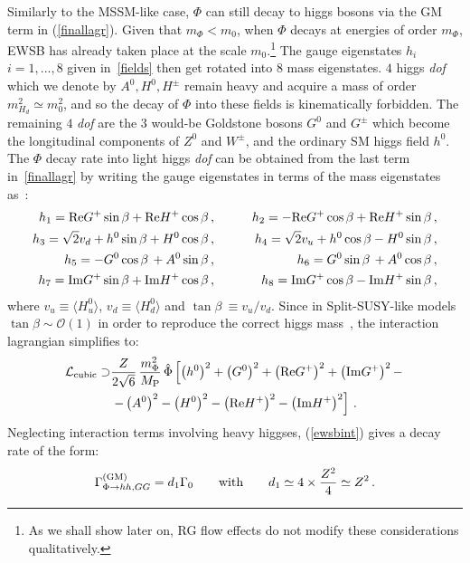 \documentclass[12pt,a4paper]{book}
\def\nn{\nonumber}
\def\nn{\nonumber}
\newcommand{\mc}{\mathcal}
\begin{document}
Similarly to the MSSM-like case, $\Phi$ can still decay to higgs bosons via the GM term in (\ref{finallagr}). Given that $m_\Phi< m_0$, when $\Phi$ decays at energies of order $m_\Phi$, EWSB has already taken place at the scale $m_0$.\footnote{As we shall show later on, RG flow effects do not modify these considerations qualitatively.} The gauge eigenstates $h_i$ $i=1,...,8$ given in~\eqref{fields} then get rotated into $8$ mass eigenstates. $4$ higgs \textit{dof} which we denote by $A^0, H^0, H^\pm$ remain heavy and acquire a mass of order $m_{H_d}^2 \simeq m_0^2$, and so the decay of $\Phi$ into these fields is kinematically forbidden. The remaining $4$ \textit{dof} are the $3$ would-be Goldstone bosons $G^0$ and $G^{\pm}$ which become the longitudinal components of $Z^0$ and $W^{\pm}$, and the ordinary SM higgs field $h^0$. The $\Phi$ decay rate into light higgs \textit{dof} can be obtained from the last term in~\eqref{finallagr} by writing the gauge eigenstates in terms of the mass eigenstates as~\cite{Martin:1997ns}:
\begin{align}
h_1 = {\rm Re} G^+ \sin\beta + {\rm Re} H^+ \cos\beta\,,&\qquad& h_2 = - {\rm Re} G^+ \cos\beta + {\rm Re} H^+ \sin\beta\,, \nn \\
h_3 = \sqrt{2} v_d + h^0 \sin\beta + H^0 \cos \beta \,, &\qquad& h_4 = \sqrt{2} v_u + h^0 \cos\beta - H^0 \sin\beta \,, \nn \\
h_5 = - G^0 \cos\beta\, + A^0 \sin \beta\,,&\qquad& h_6 = G^0 \sin\beta\, + A^0 \cos \beta\,, \nn \\
h_7 = {\rm Im} G^+ \sin\beta + {\rm Im} H^+ \cos \beta\,,&\qquad& h_8 = {\rm Im} G^+ \cos\beta - {\rm Im} H^+ \sin\beta\,,
\label{gauge-mass}
\end{align}
where $v_u \equiv \langle H^0_u \rangle$, $v_d \equiv \langle H^0_d \rangle$ and $\tan \beta~\equiv v_u/v_d$. Since in Split-SUSY-like models $\tan \beta \sim \mc{O}(1)$ in order to reproduce the correct higgs mass~\cite{Giudice:2011cg, Bagnaschi:2014rsa}, the interaction lagrangian simplifies to:
\begin{align}
\mc{L}_{\rm cubic} \supset &\frac{Z}{2\sqrt{6}}\, \frac{m_\Phi^2}{M_{\rm P}} \, 
\hat\Phi \left[\left(h^0\right)^2+\left(G^0\right)^2+\left({\rm Re}G^+\right)^2+\left({\rm Im} G^+\right)^2 - \right. \nn \\
&\left.- \left(A^0\right)^2 - \left(H^0\right)^2 - \left({\rm Re}H^+\right)^2 - \left({\rm Im}H^+\right)^2\right]\,.
\label{ewsbint}
\end{align}
Neglecting interaction terms involving heavy higgses, (\ref{ewsbint}) gives a decay rate of the form:
\begin{align}
\Gamma^{\rm (GM)}_{\Phi \rightarrow hh,GG}=d_1 \Gamma_0\qquad\text{with}\qquad d_1 \simeq 4\times\frac{Z^2}{4}\simeq Z^2\,.
\end{align}
\end{document}
